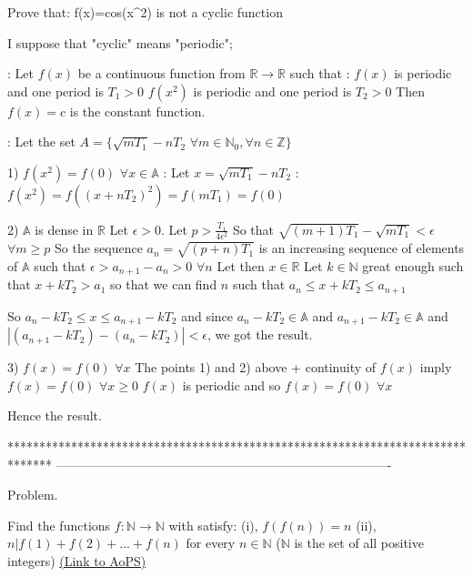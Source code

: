 \begin{solution}
	\begin{tcolorbox}Prove that: f(x)=cos(x^2) is not a cyclic function\end{tcolorbox}
I suppose that "cyclic" means "periodic";

 :
Let $f(x)$ be a continuous function from $\mathbb R\to\mathbb R$ such that :
$f(x)$ is periodic and one period is $T_1>0$
$f(x^2)$ is periodic and one period is $T_2>0$
Then $f(x)=c$ is the constant function.

:
Let the set $A=\{\sqrt{mT_1}-nT_2$ $\forall m\in\mathbb N_0,\forall n\in\mathbb Z\}$

1) $f(x^2)=f(0)$ $\forall x\in\mathbb A$ :
Let $x=\sqrt{mT_1}-nT_2$ : $f(x^2)=f((x+nT_2)^2)=f(mT_1)=f(0)$

2) $\mathbb A$ is dense in $\mathbb R$
Let $\epsilon>0$.
Let $p>\frac{T_1}{4\epsilon^2}$ So that $\sqrt{(m+1)T_1}-\sqrt{mT_1}<\epsilon$ $\forall m\ge p$
So the sequence $a_n=\sqrt{(p+n)T_1}$ is an increasing sequence of elements of $\mathbb A$ such that $\epsilon >a_{n+1}-a_n>0$ $\forall n$
Let then $x\in\mathbb R$
Let $k\in\mathbb N$ great enough such that $x+kT_2>a_1$ so that we can find $n$ such that $a_n\le x+kT_2\le a_{n+1}$

So $a_n-kT_2\le x\le a_{n+1}-kT_2$ and since $a_n-kT_2\in\mathbb A$ and $a_{n+1}-kT_2\in\mathbb A$ and $|(a_{n+1}-kT_2)-(a_{n}-kT_2)|<\epsilon$, we got the result.

3) $f(x)=f(0)$ $\forall x$
The points 1) and 2) above + continuity of $f(x)$ imply $f(x)=f(0)$ $\forall x\ge 0$
$f(x)$ is periodic and so $f(x)=f(0)$ $\forall x$


Hence the result.
\end{solution}
*******************************************************************************
-------------------------------------------------------------------------------

\begin{problem}
	\begin{bolded}Problem.\end{bolded} Find the functions $f:\mathbb{N}\rightarrow \mathbb{N}$ with satisfy:
(i), $f(f(n))=n$ 
(ii), $n|f(1)+f(2)+...+f(n)$
for every $n\in \mathbb{N}$ ($\mathbb{N}$ is the set of all positive integers)
	\flushright \href{https://artofproblemsolving.com/community/c6h529756}{(Link to AoPS)}
\end{problem}



